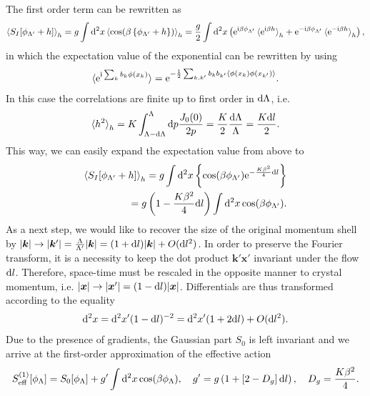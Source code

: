 The first order term can be rewritten as
\begin{align}
    \braket{S_I[\phi_{\Lambda'}+h]}_h = g\int\mathrm d^2x\braket{\cos(\beta\left\{ \phi_{\Lambda'}+h \right\})}_h
    = \frac g2\int\mathrm d^2x\left( \mathrm e^{\mathrm i\beta \phi_{\Lambda'}}\braket{\mathrm e^{\mathrm i\beta h}}_h+\mathrm e^{-\mathrm i\beta \phi_{\Lambda'}}\braket{\mathrm e^{-\mathrm i\beta h}}_h \right),
\end{align}
in which the expectation value of the exponential can be rewritten by using
\begin{align}
    \braket{\mathrm e^{\mathrm i\sum_kb_k\phi(x_k)}} = \mathrm e^{-\frac12\sum_{k,k'}b_kb_{k'}\braket{\phi(x_k)\phi(x_{k'})}}.
    \label{eq:expectation_value_exponential_fields}
\end{align}
In this case the correlations are finite up to first order in $\mathrm d\Lambda$, i.e.
\begin{align}
    \braket{h^2}_h = K\int_{\Lambda-\mathrm d\Lambda}^\Lambda\mathrm d p\frac{J_0(0)}{2p} = \frac K2\frac{\mathrm d\Lambda}\Lambda = \frac{K\mathrm d l}2.
    \label{eq:rg_hsq}
\end{align}
This way, we can easily expand the expectation value from above to
\begin{align}
    \braket{S_I[\phi_{\Lambda'}+h]}_h
    = g\int\mathrm d^2x\left\{ \cos(\beta \phi_{\Lambda'})\mathrm e^{-\frac{K\beta^2}4\mathrm d l} \right\}
    \\
    = g\left( 1 - \frac{K\beta^2}4\mathrm d l \right)\int\mathrm d^2x\cos(\beta \phi_{\Lambda'}).
\end{align}
As a next step, we would like to recover the size of the original momentum shell by $|{\bm k}|\rightarrow |{\bm k}'|=\frac{\Lambda}{\Lambda'}|{\bm k}| = (1+\mathrm d l)|{\bm k}|+O(\mathrm d l^2)$.
In order to preserve the Fourier transform, it is a necessity to keep the dot product ${\bm k'}{\bm x'}$ invariant under the flow $\mathrm d l$.
Therefore, space-time must be rescaled in the opposite manner to crystal momentum, i.e. $|{\bm x}|\rightarrow|{\bm x'}|=(1-\mathrm d l)|{\bm x}|$.
Differentials are thus transformed according to the equality
\begin{align}
    \mathrm d^2x = \mathrm d^2 x'(1-\mathrm d l)^{-2} = \mathrm d^2 x'(1+2\mathrm d l) + O(\mathrm d l^2).
\end{align}
Due to the presence of gradients, the Gaussian part $S_0$ is left invariant and we arrive at the first-order approximation of the effective action
\begin{align}
    S^{(1)}_{\rm eff}[\phi_\Lambda]=S_0[\phi_\Lambda] + g'\int\mathrm d^2x\cos(\beta \phi_{\Lambda}),
    \quad
    g' = g\left( 1 + \left[ 2-D_g \right]\mathrm d l \right),
    \quad
    D_g=\frac{K\beta^2}4.
    \label{eq:bkt_first_order}
\end{align}
